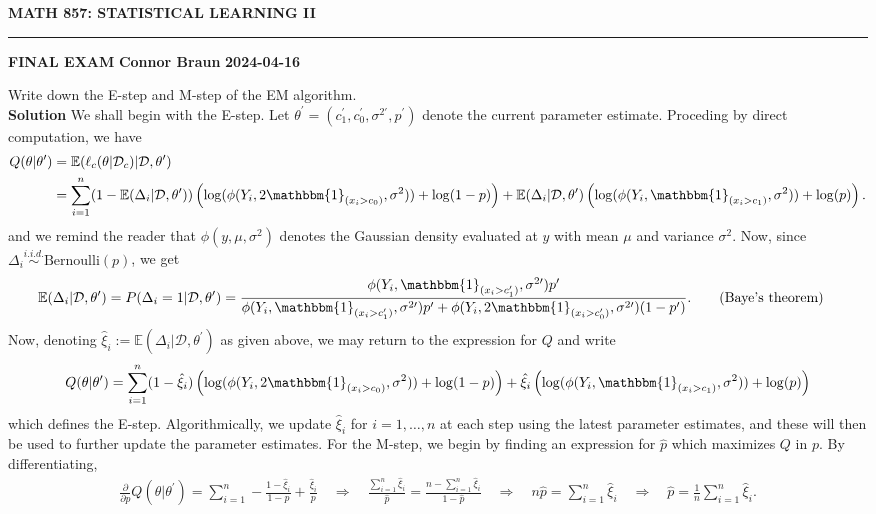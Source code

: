 \documentclass[10pt]{article}
\newcommand{\E}{\mathbb{E}}
\newcommand{\bp}[1]{\left({#1}\right)}
\newcommand{\1}[1]{\mathbbm{1}_{#1}}
\newcommand{\mc}[1]{\mathcal{#1}}
\begin{document}
    \begin{center}
        {\bf\large{MATH 857: STATISTICAL LEARNING II}}
        \smallskip
        \hrule
        \smallskip
        {\bf FINAL EXAM} \hfill {\bf Connor Braun} \hfill {\bf 2024-04-16}
    \end{center}
 Write down the E-step and M-step of the EM algorithm.\\[5pt]
{\bf Solution}\hspace{5pt} We shall begin with the E-step. Let $\theta^\prime=(c_1^\prime,c_0^\prime,\sigma^{2\prime},p^\prime)$ denote the current parameter estimate.  Proceding by direct computation, we have
\begin{align*}
    Q(\theta|\theta^\prime)&=\E(\ell_c(\theta|\mc{D}_c)|\mc{D},\theta^\prime)\\
    &=\sum_{i=1}^n(1-\E(\Delta_i|\mc{D},\theta^\prime))\bp{\log(\phi(Y_i,2\mathbbm{1}_{(x_i>c_0)},\sigma^2))+\log(1-p)}+\E(\Delta_i|\mc{D},\theta^\prime)\bp{\log(\phi(Y_i,\mathbbm{1}_{(x_i>c_1)},\sigma^2))+\log(p)}.
\end{align*}
and we remind the reader that $\phi(y,\mu,\sigma^2)$ denotes the Gaussian density evaluated at $y$ with mean $\mu$ and variance $\sigma^2$. Now, since $\Delta_i\overset{i.i.d.}{\sim}\text{Bernoulli}(p)$, we get
\begin{align*}
    \E(\Delta_i|\mc{D},\theta^\prime)&=P(\Delta_i=1|\mc{D},\theta^\prime)=\frac{\phi(Y_i,\mathbbm{1}_{(x_i>c_1^\prime)},\sigma^{2\prime})p^\prime}{\phi(Y_i,\mathbbm{1}_{(x_i>c_1^\prime)},\sigma^{2\prime})p^\prime + \phi(Y_i,2\mathbbm{1}_{(x_i>c_0^\prime)},\sigma^{2\prime})(1-p^\prime)}.\tag{Baye's theorem}
\end{align*}
Now, denoting $\hat{\xi}_i:=\E(\Delta_i|\mc{D},\theta^\prime)$ as given above, we may return to the expression for $Q$ and write
\begin{align*}
    Q(\theta|\theta^\prime)=\sum_{i=1}^n(1-\hat{\xi}_i)\bp{\log(\phi(Y_i,2\mathbbm{1}_{(x_i>c_0)},\sigma^2))+\log(1-p)}+\hat{\xi}_i\bp{\log(\phi(Y_i,\mathbbm{1}_{(x_i>c_1)},\sigma^2))+\log(p)}
\end{align*}
which defines the E-step. Algorithmically, we update $\hat{\xi}_i$ for $i=1,\dots,n$ at each step using the latest parameter estimates, and these will then be used to further update the parameter estimates. For the M-step, we begin by finding an expression for $\hat{p}$ which maximizes $Q$ in $p$. By differentiating,
\begin{align*}
    \frac{\partial}{\partial p}Q(\theta|\theta^\prime)=\sum_{i=1}^n-\frac{1-\hat{\xi}_i}{1-p}+\frac{\hat{\xi}_i}{p}\quad\Rightarrow\quad\frac{\sum_{i=1}^n\hat{\xi}_i}{\hat{p}}=\frac{n-\sum_{i=1}^n\hat{\xi}_i}{1-\hat{p}}\quad\Rightarrow\quad n\hat{p}=\sum_{i=1}^n\hat{\xi}_i\quad\Rightarrow\quad \hat{p}=\frac{1}{n}\sum_{i=1}^n\hat{\xi}_i.
\end{align*} 
\end{document}

